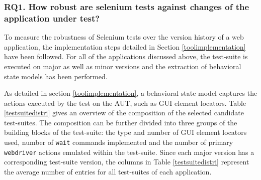 \subsubsection*{RQ1. How robust are selenium tests against changes of the application under test?}
To measure the robustness of Selenium tests over the version history of a web application, the implementation steps detailed in Section \ref{toolimplementation} have been followed. 
For all of the applications discussed above, the
test-suite is executed on major as well as minor versions and the extraction of behavioral state models has been performed. 

As detailed in section \ref{toolimplementation}, a behavioral state model captures the actions executed by the test on the AUT, such as GUI element locators. Table \ref{testsuitedistri} gives an overview of the composition of the selected candidate test-suites. The composition can be further divided into three groups of the building blocks of the test-suite: the type and number of GUI element locators used, number of \texttt{wait} commands implemented and the number of primary \texttt{webdriver} actions emulated within the test-suite. Since each major version has a corresponding test-suite version, the columns in Table \ref{testsuitedistri} represent the average number of entries for all test-suites of each application.  


